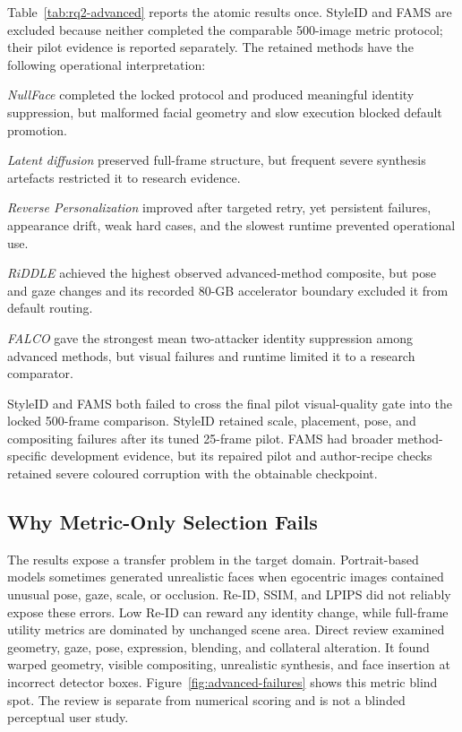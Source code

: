 \documentclass[10pt,twocolumn]{IEEEtran}
\begin{document}
Table~\ref{tab:rq2-advanced} reports the atomic results once. StyleID and FAMS
are excluded because neither completed the comparable 500-image metric
protocol; their pilot evidence is reported separately. The retained methods
have the following operational interpretation:
\par\vspace{1.5pt}
\noindent\textit{NullFace} completed the locked protocol and produced meaningful
identity suppression, but malformed facial geometry and slow execution blocked
default promotion.\par\vspace{1.5pt}
\noindent\textit{Latent diffusion} preserved full-frame structure, but frequent
severe synthesis artefacts restricted it to research evidence.
\par\vspace{1.5pt}
\noindent\textit{Reverse Personalization} improved after targeted retry, yet
persistent failures, appearance drift, weak hard cases, and the slowest runtime
prevented operational use.\par\vspace{1.5pt}
\noindent\textit{RiDDLE} achieved the highest observed advanced-method composite,
but pose and gaze changes and its recorded 80-GB accelerator boundary excluded
it from default routing.\par\vspace{1.5pt}
\noindent\textit{FALCO} gave the strongest mean two-attacker identity suppression
among advanced methods, but visual failures and runtime limited it to a research
comparator.\par

StyleID and FAMS both failed to cross the final pilot visual-quality gate into
the locked 500-frame comparison. StyleID retained scale, placement, pose, and
compositing failures after its tuned 25-frame pilot. FAMS had broader
method-specific development evidence, but its repaired pilot and author-recipe
checks retained severe coloured corruption with the obtainable checkpoint.

\subsection{Why Metric-Only Selection Fails}

The results expose a transfer problem in the target domain. Portrait-based
models sometimes generated unrealistic faces when egocentric images contained
unusual pose, gaze, scale, or occlusion. Re-ID, SSIM, and LPIPS did not reliably
expose these errors. Low Re-ID can reward any identity change, while full-frame
utility metrics are dominated by unchanged scene area. Direct review examined
geometry, gaze, pose, expression, blending, and collateral alteration. It found
warped geometry, visible compositing, unrealistic synthesis, and face insertion
at incorrect detector boxes. Figure~\ref{fig:advanced-failures} shows this metric
blind spot. The review is separate from numerical scoring and is not a blinded
perceptual user study.
\end{document}
